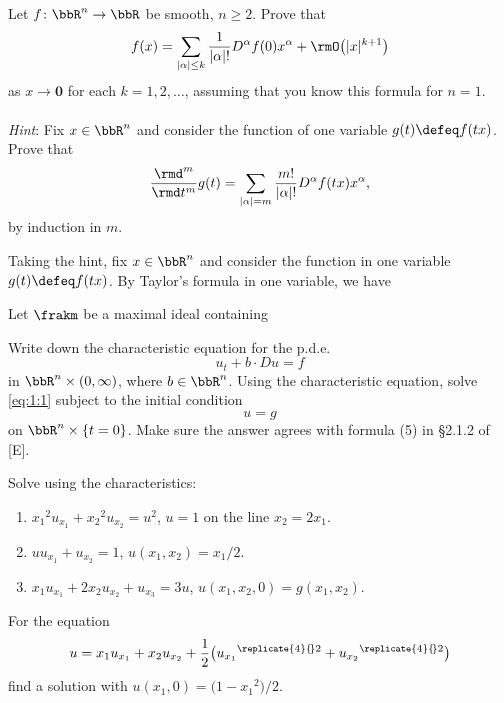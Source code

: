 \begin{problem}
  Let \(f\colon\bbR^n\to\bbR\) be smooth, \(n\geq 2\). Prove that
  \[
    f(x)=\sum_{|\alpha|\leq k}
    \frac{1}{|\alpha|!}D^\alpha f(0)x^\alpha+\rmO\bigl(|x|^{k+1}\bigr)
  \]
  as \(x\to\mathbf{0}\) for each \(k=1,2,\dotsc\), assuming that you know this
  formula for \(n=1\).
  \\\\
  \emph{Hint}: Fix \(x\in\bbR^n\) and consider the function of one variable
  \(g(t)\defeq f(tx)\). Prove that
  \[
    \frac{\rmd^m}{\rmd t^m}g(t)
    =\sum_{|\alpha|=m}\frac{m!}{|\alpha|!} D^\alpha f(tx)x^\alpha,
  \]
  by induction in \(m\).
\end{problem}
\begin{solution}
  Taking the hint, fix \(x\in\bbR^n\) and consider the function in one
  variable \(g(t)\defeq f(tx)\). By Taylor's formula in one variable,
  we have

  Let \(\frakm\) be a maximal ideal containing
\end{solution}
\newpage

\begin{problem}
  Write down the characteristic equation for the p.d.e.\@
  \[
    \label{eq:1:1}
    \tag{\(*\)}
    u_t+b\cdot Du=f
  \]
  in \(\bbR^n\times(0,\infty)\), where \(b\in\bbR^n\). Using the
  characteristic equation, solve \eqref{eq:1:1} subject to the initial
  condition
  \[
    u=g
  \]
  on \(\bbR^n\times\{t=0\}\). Make sure the answer agrees with formula (5)
  in \S 2.1.2 of [E].
\end{problem}
\begin{solution}

\end{solution}
\newpage

\begin{problem}
  Solve using the characteristics:
  \begin{enumerate}[label=(\alph*)]
  \item \({x_1}^{\!2}u_{x_1}+{x_2}^{\!2}u_{x_2}=u^2\), \(u=1\) on the line
    \(x_2=2x_1\).
  \item \(uu_{x_1}+u_{x_2}=1\), \(u(x_1,x_2)=x_1/2\).
  \item \(x_1u_{x_1}+2x_2u_{x_2}+u_{x_3}=3u\),
    \(u(x_1,x_2,0)=g(x_1,x_2)\).
  \end{enumerate}
\end{problem}
\begin{solution}

\end{solution}
\newpage

\begin{problem}
  For the equation
  \[
    u=x_1u_{x_1}+x_2u_{x_2}
    +\frac{1}{2}\bigl({u_{x_1}}^{\replicate{4}{\!}2}+{u_{x_2}}^{\replicate{4}{\!}2}\bigr)
  \]
  find a solution with \(u(x_1,0)=\bigl(1-{x_1}^{\!2}\bigr)/2\).
\end{problem}
\begin{solution}

\end{solution}

